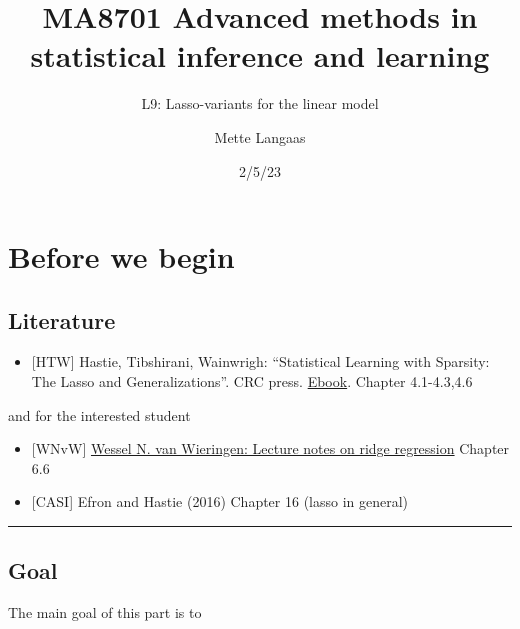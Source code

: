 \documentclass[
  letterpaper,
  DIV=11,
  numbers=noendperiod]{scrartcl}
\title{MA8701 Advanced methods in statistical inference and learning}
\subtitle{L9: Lasso-variants for the linear model}
\author{Mette Langaas}
\date{2/5/23}
\providecommand{\tightlist}{%
  \setlength{\itemsep}{0pt}\setlength{\parskip}{0pt}}\usepackage{longtable,booktabs,array}
\renewcommand*\contentsname{Table of contents}
\newcommand\contentsname{Table of contents}
\begin{document}
\maketitle
\ifdefined\Shaded\renewenvironment{Shaded}{\begin{tcolorbox}[interior hidden, boxrule=0pt, borderline west={3pt}{0pt}{shadecolor}, enhanced, frame hidden, breakable, sharp corners]}{\end{tcolorbox}}\fi

\renewcommand*\contentsname{Table of contents}
{
\hypersetup{linkcolor=}
\setcounter{tocdepth}{3}
\tableofcontents
}
\hypertarget{before-we-begin}{%
\section{Before we begin}\label{before-we-begin}}

\hypertarget{literature}{%
\subsection{Literature}\label{literature}}

\begin{itemize}
\tightlist
\item
  {[}HTW{]} Hastie, Tibshirani, Wainwrigh: ``Statistical Learning with
  Sparsity: The Lasso and Generalizations''. CRC press.
  \href{https://hastie.su.domains/StatLearnSparsity/}{Ebook}. Chapter
  4.1-4.3,4.6
\end{itemize}

and for the interested student

\begin{itemize}
\tightlist
\item
  {[}WNvW{]} \href{https://arxiv.org/pdf/1509.09169v7.pdf}{Wessel N. van
  Wieringen: Lecture notes on ridge regression} Chapter 6.6
\item
  {[}CASI{]} Efron and Hastie (2016) Chapter 16 (lasso in general)
\end{itemize}

\begin{center}\rule{0.5\linewidth}{0.5pt}\end{center}

\hypertarget{goal}{%
\subsection{Goal}\label{goal}}

The main goal of this part is to
\end{document}
